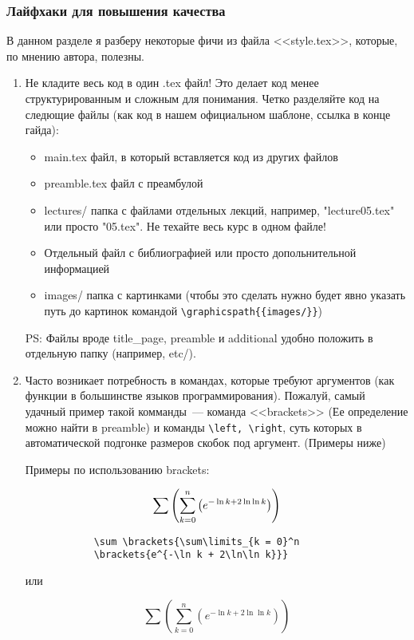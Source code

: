 \subsubsection{Лайфхаки для повышения качества}
В данном разделе я разберу некоторые фичи из файла <<style.tex>>, которые, по мнению автора, полезны.
\begin{enumerate}
	\item Не кладите весь код в один .tex файл!
	Это делает код менее структурированным и сложным для понимания. 
	Четко разделяйте код на следющие файлы (как код в нашем официальном шаблоне, ссылка в конце гайда):
	\begin{itemize}
		\item main.tex файл, в который вставляется код из других файлов
		
		\item preamble.tex файл с преамбулой
		
		\item lectures/ папка с файлами отдельных лекций, например, "lecture05.tex" или просто "05.tex". Не техайте весь курс в одном файле!
		
		\item Отдельный файл с библиографией или просто допольнительной информацией 
		
		\item images/ папка с картинками (чтобы это сделать нужно будет явно указать путь до картинок командой \verb|\graphicspath{{images/}}|)
	\end{itemize}
	PS: Файлы вроде title\_page, preamble и additional удобно положить в отдельную папку (например, etc/).
	
	\item Часто возникает потребность в командах, которые требуют аргументов (как функции в большинстве языков программирования).
	Пожалуй, самый удачный пример такой комманды~--- команда <<brackets>> (Ее определение можно найти в preamble) и команды  \verb|\left, \right|, суть которых в автоматической подгонке размеров скобок под аргумент. (Примеры ниже)
	\begin{table*}[!ht]
		Примеры по использованию brackets:
		\begin{multicols}{2}
			$$
			\sum \left({\sum\limits_{k = 0}^n \left({e^{-\ln k + 2\ln\ln k}}\right)}\right)
			$$
			
			\columnbreak
			\begin{verbatim}
			\sum \brackets{\sum\limits_{k = 0}^n 
			\brackets{e^{-\ln k + 2\ln\ln k}}}
			\end{verbatim}
		\end{multicols}
		или
		\begin{multicols}{2}
			$$
			\sum (\sum\limits_{k = 0}^n (e^{-\ln k + 2\ln\ln k}))
			$$
			

\end{multicols}
\end{table*}
\end{enumerate}
